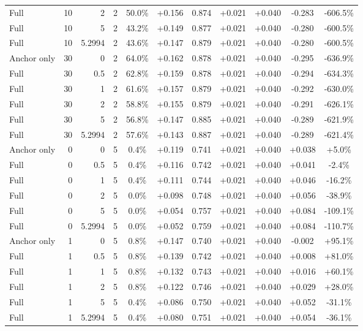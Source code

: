 \begin{table}[htbp]
\begin{tabular}{lrrrccccccc}
Full & 10 & 2 & 2 & 50.0\% & +0.156 & 0.874 & +0.021 & +0.040 & -0.283 & -606.5\% \\
Full & 10 & 5 & 2 & 43.2\% & +0.149 & 0.877 & +0.021 & +0.040 & -0.280 & -600.5\% \\
Full & 10 & 5.2994 & 2 & 43.6\% & +0.147 & 0.879 & +0.021 & +0.040 & -0.280 & -600.5\% \\
Anchor only & 30 & 0 & 2 & 64.0\% & +0.162 & 0.878 & +0.021 & +0.040 & -0.295 & -636.9\% \\
Full & 30 & 0.5 & 2 & 62.8\% & +0.159 & 0.878 & +0.021 & +0.040 & -0.294 & -634.3\% \\
Full & 30 & 1 & 2 & 61.6\% & +0.157 & 0.879 & +0.021 & +0.040 & -0.292 & -630.0\% \\
Full & 30 & 2 & 2 & 58.8\% & +0.155 & 0.879 & +0.021 & +0.040 & -0.291 & -626.1\% \\
Full & 30 & 5 & 2 & 56.8\% & +0.147 & 0.885 & +0.021 & +0.040 & -0.289 & -621.9\% \\
Full & 30 & 5.2994 & 2 & 57.6\% & +0.143 & 0.887 & +0.021 & +0.040 & -0.289 & -621.4\% \\
Anchor only & 0 & 0 & 5 & 0.4\% & +0.119 & 0.741 & +0.021 & +0.040 & +0.038 & +5.0\% \\
Full & 0 & 0.5 & 5 & 0.4\% & +0.116 & 0.742 & +0.021 & +0.040 & +0.041 & -2.4\% \\
Full & 0 & 1 & 5 & 0.4\% & +0.111 & 0.744 & +0.021 & +0.040 & +0.046 & -16.2\% \\
Full & 0 & 2 & 5 & 0.0\% & +0.098 & 0.748 & +0.021 & +0.040 & +0.056 & -38.9\% \\
Full & 0 & 5 & 5 & 0.0\% & +0.054 & 0.757 & +0.021 & +0.040 & +0.084 & -109.1\% \\
Full & 0 & 5.2994 & 5 & 0.0\% & +0.052 & 0.759 & +0.021 & +0.040 & +0.084 & -110.7\% \\
Anchor only & 1 & 0 & 5 & 0.8\% & +0.147 & 0.740 & +0.021 & +0.040 & -0.002 & +95.1\% \\
Full & 1 & 0.5 & 5 & 0.8\% & +0.139 & 0.742 & +0.021 & +0.040 & +0.008 & +81.0\% \\
Full & 1 & 1 & 5 & 0.8\% & +0.132 & 0.743 & +0.021 & +0.040 & +0.016 & +60.1\% \\
Full & 1 & 2 & 5 & 0.8\% & +0.122 & 0.746 & +0.021 & +0.040 & +0.029 & +28.0\% \\
Full & 1 & 5 & 5 & 0.4\% & +0.086 & 0.750 & +0.021 & +0.040 & +0.052 & -31.1\% \\
Full & 1 & 5.2994 & 5 & 0.4\% & +0.080 & 0.751 & +0.021 & +0.040 & +0.054 & -36.1\% \\

\end{tabular}
\end{table}
